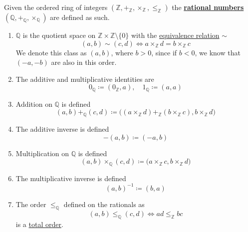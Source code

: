   \begin{definition}[Rationals]
    \label{def:rationals}
    Given the ordered ring of integers $(\mathbb{Z}, +_{\mathbb{Z}}, \times_{\mathbb{Z}}, \leq_{\mathbb{Z}})$ the \textbf{\hyperref[alg-def:rational-numbers]{rational numbers}} $(\mathbb{Q}, +_{\mathbb{Q}}, \times_{\mathbb{Q}})$ are defined as such. 
    \begin{enumerate}
      \item $\mathbb{Q}$ is the quotient space on $\mathbb{Z} \times \mathbb{Z} \setminus \{0\}$ with the \hyperref[def:equivalence_relation]{equivalence relation} $\sim$ 
      \begin{equation}
        (a, b) \sim (c, d) \iff a \times_{\mathbb{Z}} d = b \times_{\mathbb{Z}} c
      \end{equation} 
      We denote this class as $(a, b)$, where $b > 0$, since if $b < 0$, we know that $(-a, -b)$ are also in this order. 

      \item The additive and multiplicative identities are 
      \begin{equation}
        0_{\mathbb{Q}} \coloneqq (0_{\mathbb{Z}}, a), \quad 1_{\mathbb{Q}} \coloneqq (a, a)
      \end{equation}

      \item Addition on $\mathbb{Q}$ is defined 
      \begin{equation}
        (a, b) +_{\mathbb{Q}} (c, d) \coloneqq \big( (a \times_{\mathbb{Z}} d) +_{\mathbb{Z}} (b \times_{\mathbb{Z}} c), b \times_{\mathbb{Z}} d \big) 
      \end{equation}

      \item The additive inverse is defined 
      \begin{equation}
        -(a, b) \coloneqq (-a, b)
      \end{equation}

      \item Multiplication on $\mathbb{Q}$ is defined 
      \begin{equation}
        (a, b) \times_{\mathbb{Q}} (c, d) \coloneqq \big( a \times_{\mathbb{Z}} c, b \times_{\mathbb{Z}} d \big)
      \end{equation} 

      \item The multiplicative inverse is defined 
      \begin{equation}
        (a, b)^{-1} \coloneqq (b, a)
      \end{equation}

      \item The order $\leq_{\mathbb{Q}}$ defined on the rationals as 
      \begin{equation}
        (a, b) \leq_{\mathbb{Q}} (c, d) \iff ad \leq_{\mathbb{Z}} bc
      \end{equation}
      is a \hyperref[def:total-order]{total order}. 
    \end{enumerate}
  \end{definition}

